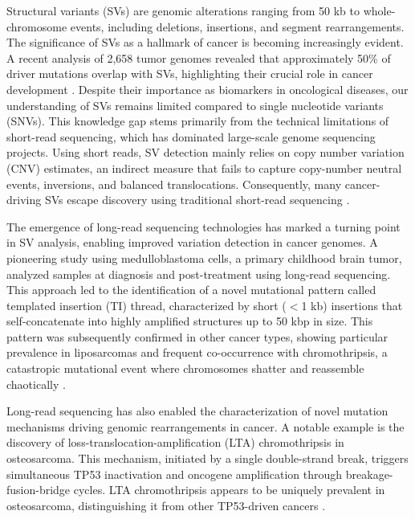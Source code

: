 Structural variants (SVs) are genomic alterations ranging from 50 kb to 
whole-chromosome events, including deletions, insertions, and segment 
rearrangements. The significance of SVs as a hallmark of cancer is becoming 
increasingly evident. A recent analysis of 2,658 tumor genomes revealed that 
approximately 50\% of driver mutations overlap with SVs, highlighting their 
crucial role in cancer development \cite{li_patterns_2020,menghi_tandem_2018}. 
Despite their importance as biomarkers in oncological diseases, our 
understanding of SVs remains limited compared to single nucleotide variants 
(SNVs). This knowledge gap stems primarily from the technical limitations of 
short-read sequencing, which has dominated large-scale genome sequencing 
projects. Using short reads, SV detection mainly relies on copy number variation 
(CNV) estimates, an indirect measure that fails to capture copy-number neutral 
events, inversions, and balanced translocations. Consequently, many 
cancer-driving SVs escape discovery using traditional short-read sequencing 
\cite{cameron_comprehensive_2019,abel_mapping_2020}.

The emergence of long-read sequencing technologies has marked a turning point in 
SV analysis, enabling improved variation detection in cancer genomes. A pioneering 
study using medulloblastoma cells, a primary childhood brain tumor, analyzed samples 
at diagnosis and post-treatment using long-read sequencing. This approach led to 
the identification of a novel mutational pattern called templated insertion (TI) 
thread, characterized by short ($<$1 kb) insertions that self-concatenate into highly 
amplified structures up to 50 kbp in size. This pattern was subsequently confirmed 
in other cancer types, showing particular prevalence in liposarcomas and frequent 
co-occurrence with chromothripsis, a catastropic mutational event where 
chromosomes shatter and reassemble chaotically \cite{rausch_long-read_2023}.

Long-read sequencing has also enabled the characterization of novel mutation 
mechanisms driving genomic rearrangements in cancer. A notable example is the 
discovery of loss-translocation-amplification (LTA) chromothripsis in osteosarcoma. 
This mechanism, initiated by a single double-strand break, triggers simultaneous 
TP53 inactivation and oncogene amplification through breakage-fusion-bridge cycles. 
LTA chromothripsis appears to be uniquely prevalent in osteosarcoma, distinguishing 
it from other TP53-driven cancers \cite{valle-inclan_ongoing_2025}.

